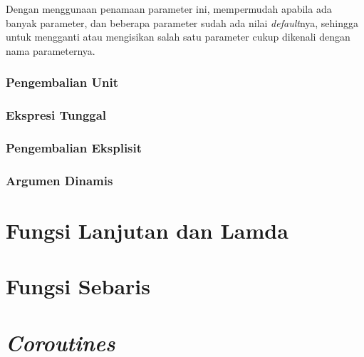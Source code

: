 Dengan menggunaan penamaan parameter ini, mempermudah apabila ada banyak parameter, dan beberapa parameter sudah ada nilai \textit{default}nya, sehingga untuk mengganti atau mengisikan salah satu parameter cukup dikenali dengan nama parameternya.

\subsubsection{Pengembalian Unit}

\subsubsection{Ekspresi Tunggal}

\subsubsection{Pengembalian Eksplisit}

\subsubsection{Argumen Dinamis}

\section{Fungsi Lanjutan dan Lamda}

\section{Fungsi Sebaris}

\section{\textit{Coroutines}}